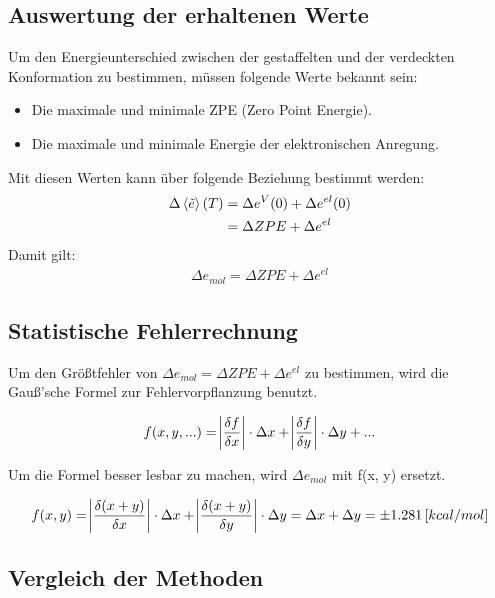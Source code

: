 \subsection{Auswertung der erhaltenen Werte}
Um den Energieunterschied zwischen der gestaffelten und der verdeckten Konformation zu bestimmen, müssen folgende Werte bekannt sein:
\begin{itemize}
    \item Die maximale und minimale ZPE (Zero Point Energie).
    \item Die maximale und minimale Energie der elektronischen Anregung.
\end{itemize}
Mit diesen Werten kann über folgende Beziehung bestimmt werden:
\begin{align*}
    \Delta \braket{\tilde{e}}(T) &= \Delta e^V (0) + \Delta e^{el} (0) \\
                                 &= \Delta ZPE + \Delta e^{el}   
\end{align*} 
Damit gilt:
\begin{align}
    \Delta e_{mol} = \Delta ZPE + \Delta e^{el} 
\end{align}


\subsection{Statistische Fehlerrechnung}

Um den Größtfehler von $\Delta e_{mol} = \Delta ZPE + \Delta e^{el} $ zu bestimmen, wird die Gauß'sche Formel zur Fehlervorpflanzung benutzt.

\begin{align}
    f(x, y, ...) = \abs{\frac{\delta f}{\delta x}} \cdot \Delta x + \abs{\frac{\delta f}{\delta y}} \cdot \Delta y + ...
\end{align}

Um die Formel besser lesbar zu machen, wird $\Delta e_{mol}$ mit f(x, y) ersetzt.

\begin{align*}
    f(x, y) =  \abs{\frac{\delta (x + y)}{\delta x}} \cdot \Delta x + \abs{\frac{\delta (x + y)}{\delta y}} \cdot \Delta y = \Delta x + \Delta y 
    = \pm 1.281 \, [kcal/mol]
\end{align*}

\subsection{Vergleich der Methoden}

